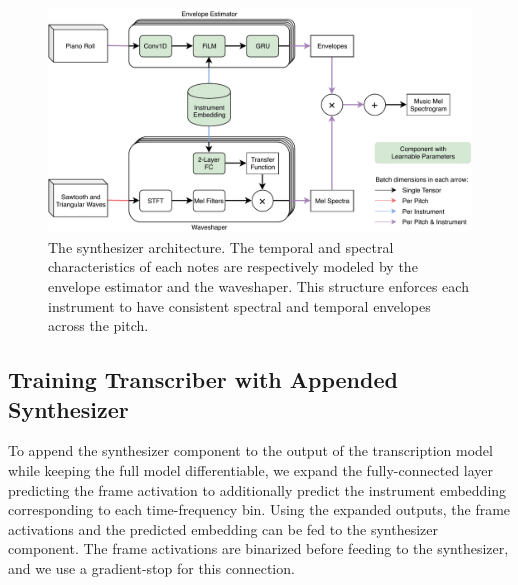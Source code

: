 \begin{figure}
	\centering
	\includegraphics[width=\textwidth]{synthesizer-architecture.pdf}
	\caption{The synthesizer architecture. The temporal and spectral characteristics of each notes are respectively modeled by the envelope estimator and the waveshaper. This structure enforces each instrument to have consistent spectral and temporal envelopes across the pitch.}\label{fig:synthesizer-architecture}
\end{figure}


\subsection{Training Transcriber with Appended Synthesizer}

To append the synthesizer component to the output of the transcription model while keeping the full model differentiable, we expand the fully-connected layer predicting the frame activation to additionally predict the instrument embedding corresponding to each time-frequency bin.
Using the expanded outputs, the frame activations and the predicted embedding can be fed to the synthesizer component.
The frame activations are binarized before feeding to the synthesizer, and we use a gradient-stop for this connection.

